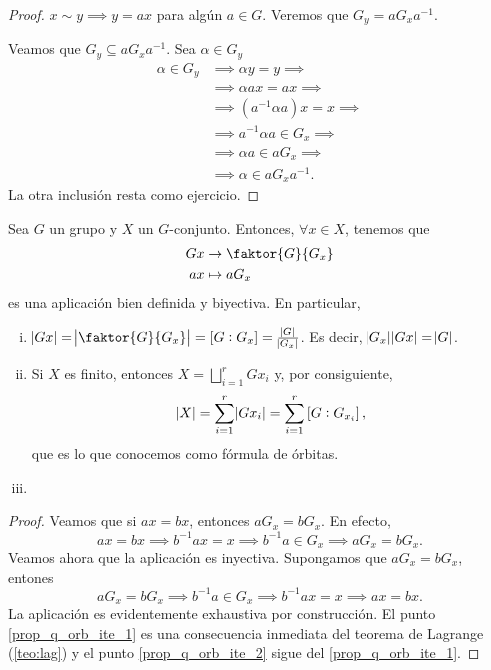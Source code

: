 \begin{proof}
    $x \sim y \implies y = ax$ para algún $a \in G$. Veremos que $G_y = aG_xa^{-1}$.

    Veamos que $G_y \subseteq aG_xa^{-1}$. Sea $\alpha \in G_y$
    \[
        \begin{aligned}
            \alpha \in G_y &\implies \alpha y = y \implies \\
            &\implies \alpha ax = ax \implies \\
            &\implies \left( a^{-1} \alpha a \right)x = x \implies \\
            &\implies a^{-1} \alpha a \in G_x \implies \\
            &\implies \alpha a \in a G_x \implies \\
            &\implies \alpha \in a G_x a^{-1}.
        \end{aligned}
    \]
    La otra inclusión resta como ejercicio.
\end{proof}

\begin{prop}
    Sea $G$ un grupo y $X$ un $G$-conjunto. Entonces, $\forall x \in X$, tenemos que
    \[
        \begin{aligned}
            G x &\to \faktor{G}{G_x} \\
            ax &\mapsto a G_x
        \end{aligned}
    \]
    es una aplicación bien definida y biyectiva.
    En particular,
    \begin{enumerate}[i)]
        \item\label{prop_q_orb_ite_1} $\abs{Gx} =  \abs{\faktor{G}{G_x}} = \left[ G : G_x \right] = \frac{\abs{G}}{\abs{G_x}}$. Es decir,
            $\label{Gx}\abs{G_x}\abs{Gx} = \abs{G}$.
        \item\label{prop_q_orb_ite_2} Si $X$ es finito, entonces $X = \bigsqcup\limits^r_{i = 1} G x_i$ y, por consiguiente,
            \[
                \abs{X} = \sum^r_{i = 1} \abs{G x_i} = \sum^r_{i = 1} \left[ G : G_{x_i} \right],
            \]
            que es lo que conocemos como fórmula de órbitas.
        \item %
    \end{enumerate}
\end{prop}

\begin{proof}
    Veamos que si $ax = bx$, entonces $a G_x = b G_x$. En efecto,
    \[
        ax = bx \implies b^{-1}ax = x \implies b^{-1}a \in G_x \implies aG_x = bG_x.
    \]
    Veamos ahora que la aplicación es inyectiva. Supongamos que $aG_x = bG_x$, entones
    \[
        a G_x = b G_x \implies b^{-1}a \in G_x \implies b^{-1}a x = x \implies ax = bx.
    \]
    La aplicación es evidentemente exhaustiva por construcción.
    El punto \ref{prop_q_orb_ite_1} es una consecuencia inmediata del teorema de Lagrange (\ref{teo:lag}) y el punto \ref{prop_q_orb_ite_2} sigue del \ref{prop_q_orb_ite_1}.
    
\end{proof}

